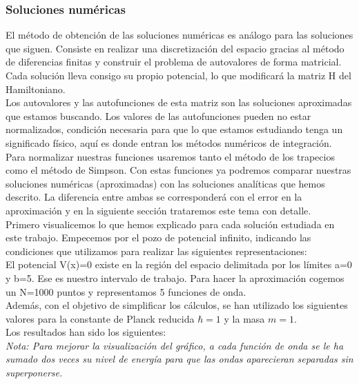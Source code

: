 \documentclass[12pt]{article}
\begin{document}
    \subsubsection{Soluciones numéricas}

    El método de obtención de las soluciones numéricas es análogo para las soluciones que siguen. Consiste en realizar una discretización del espacio gracias al método de diferencias finitas y construir el problema de autovalores de forma matricial. Cada solución lleva consigo su propio potencial, lo que modificará la matriz H del Hamiltoniano.\\

    Los autovalores y las autofunciones de esta matriz son las soluciones aproximadas que estamos buscando. Los valores de las autofunciones pueden no estar normalizados, condición necesaria para que lo que estamos estudiando tenga un significado físico, aquí es donde entran los métodos numéricos de integración.\\

    Para normalizar nuestras funciones usaremos tanto el método de los trapecios como el método de Simpson. Con estas funciones ya podremos comparar nuestras soluciones numéricas (aproximadas) con las soluciones analíticas que hemos descrito. La diferencia entre ambas se corresponderá con el error en la aproximación y en la siguiente sección trataremos este tema con detalle.\\
    
    Primero visualicemos lo que hemos explicado para cada solución estudiada en este trabajo. Empecemos por el pozo de potencial infinito, indicando las condiciones que utilizamos para realizar las siguientes representaciones:\\

     El potencial V(x)=0 existe en la región del espacio delimitada por los límites a=0 y b=5. Ese es nuestro intervalo de trabajo. Para hacer la aproximación cogemos un N=1000 puntos y representamos 5 funciones de onda.\\

     Además, con el objetivo de simplificar los cálculos, se han utilizado los siguientes valores para la constante de Planck reducida $\hbar=1$ y la masa $m=1$.\\
     
     Los resultados han sido los siguientes:\\

     \textit{Nota: Para mejorar la visualización del gráfico, a cada función de onda se le ha sumado dos veces su nivel de energía para que las ondas aparecieran separadas sin superponerse.}
\end{document}
